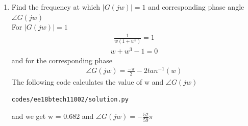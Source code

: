 \begin{enumerate}[label=\thesection.\arabic*.,ref=\thesection.\theenumi]
\item Find the frequency at which $|G(jw)| = 1$ and corresponding phase angle $\angle G(jw)$
\\
\solution 
For $|G(jw)| = 1$
\begin{align}
\frac{1}{w(1+w^2)} = 1
\end{align}
\begin{align}
w + w^3 - 1 = 0
\end{align}
and for the corresponding phase
\begin{align}
\angle G(jw) = \frac{-\pi}{2} - 2tan^{-1}(w)
\end{align}
The following code calculates the value of w and $\angle G(jw)$
%
\begin{lstlisting}
codes/ee18btech11002/solution.py
\end{lstlisting}
%
 
and we get w = 0.682 and $\angle G(jw)=-\frac{52}{59}\pi$


\end{enumerate}
